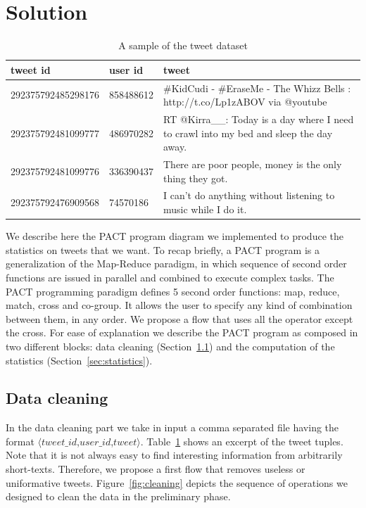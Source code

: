 \section{Solution}
\label{sec:solution}

\begin{table}[!t]
\begin{tabular}{|l|l|l|}
\hline
tweet id & user id & tweet\\
\hline
292375792485298176&858488612& \#KidCudi - \#EraseMe - The Whizz Bells : http://t.co/Lp1zABOV via @youtube\\
292375792481099777&486970282& RT @Kirra\_\_: Today is a day where I need to crawl into my bed and sleep the day away.\\
292375792481099776&336390437& There are poor people, money is the only thing they got.\\
292375792476909568&74570186& I can't do anything without listening to music while I do it.\\
\hline
\end{tabular}
\caption{A sample of the tweet dataset}
\label{tbl:tweets}
\end{table}


We describe here the PACT program diagram we implemented to produce the statistics on tweets that we want. 
To recap briefly, a PACT program is a generalization of the Map-Reduce paradigm, in which sequence of second order functions are issued in parallel and combined to execute complex tasks. 
The PACT programming paradigm defines 5 second order functions: map, reduce, match, cross and co-group.
It allows the user to specify any kind of combination between them, in any order.
We propose a flow that uses all the operator except the cross. 
For ease of explanation we describe the PACT program as composed in two different blocks: data cleaning (Section~\ref{sec:cleaning}) and the computation of the statistics (Section~\ref{sec:statistics}).

\subsection{Data cleaning}
\label{sec:cleaning}
In the data cleaning part we take in input a comma separated file having the format $\langle tweet\_id$,$user\_id$,$tweet \rangle$. 
Table~\ref{tbl:tweets} shows an excerpt of the tweet tuples. 
Note that it is not always easy to find interesting information from arbitrarily short-texts.
Therefore, we propose a first flow that removes useless or uniformative tweets. 
Figure~\ref{fig:cleaning} depicts the sequence of operations we designed to clean the data in the preliminary phase. 

